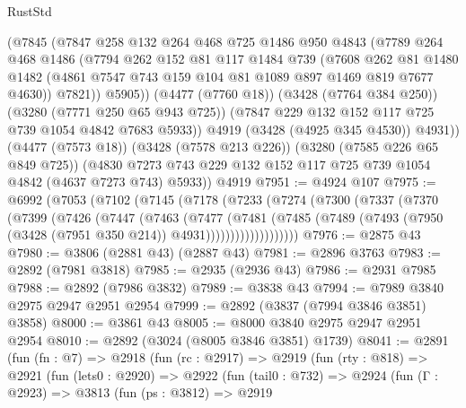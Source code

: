 \begin{lexlean}{RustStd}
\begin{coremodule}
            (@7845
              (@7847
                @258
                @132
                @264
                @468
                @725
                @1486
                @950
                @4843
                (@7789
                  @264
                  @468
                  @1486
                  (@7794
                    @262
                    @152
                    @81
                    @117
                    @1484
                    @739
                    (@7608
                      @262
                      @81
                      @1480
                      @1482
                      (@4861 @7547 @743 @159 @104 @81 @1089 @897 @1469 @819 @7677 @4630))
                    @7821))
                @5905))
            (@4477 (@7760 @18))
            (@3428 (@7764 @384 @250))
            (@3280 (@7771 @250 @65 @943 @725))
            (@7847 @229 @132 @152 @117 @725 @739 @1054 @4842 @7683 @5933))
          @4919
          (@3428 (@4925 @345 @4530))
          @4931))
      (@4477 (@7573 @18))
      (@3428 (@7578 @213 @226))
      (@3280 (@7585 @226 @65 @849 @725))
      (@4830 @7273 @743 @229 @132 @152 @117 @725 @739 @1054 @4842 (@4637 @7273 @743) @5933))
    @4919
@7951 := @4924 @107
@7975 := @6992
    (@7053
      (@7102
        (@7145
          (@7178
            (@7233
              (@7274
                (@7300
                  (@7337
                    (@7370
                      (@7399
                        (@7426
                          (@7447
                            (@7463
                              (@7477
                                (@7481
                                  (@7485
                                    (@7489
                                      (@7493
                                        (@7950 (@3428 (@7951 @350 @214)) @4931)))))))))))))))))))
@7976 := @2875 @43
@7980 := @3806 (@2881 @43) (@2887 @43)
@7981 := @2896 @3763
@7983 := @2892 (@7981 @3818)
@7985 := @2935 (@2936 @43)
@7986 := @2931 @7985
@7988 := @2892 (@7986 @3832)
@7989 := @3838 @43
@7994 := @7989 @3840 @2975 @2947 @2951 @2954
@7999 := @2892 (@3837 (@7994 @3846 @3851) @3858)
@8000 := @3861 @43
@8005 := @8000 @3840 @2975 @2947 @2951 @2954
@8010 := @2892 (@3024 (@8005 @3846 @3851) @1739)
@8041 := @2891
    (fun (fn : @7) =>
    @2918
      (fun (rc : @2917) =>
      @2919
        (fun (rty : @818) =>
        @2921
          (fun (lets0 : @2920) =>
          @2922
            (fun (tail0 : @732) =>
            @2924
              (fun (Γ : @2923) =>
              @3813
                (fun (ps : @3812) =>
                @2919

\end{coremodule}
\end{lexlean}
